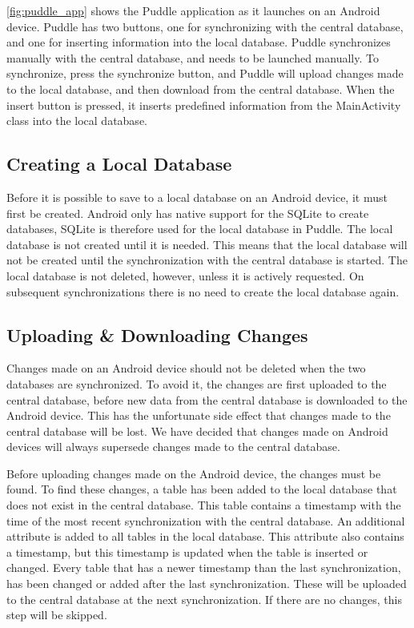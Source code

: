 \autoref{fig:puddle_app} shows the Puddle application as it launches on an Android device. Puddle has two buttons, one for synchronizing with the central database, and one for inserting information into the local database. Puddle synchronizes manually with the central database, and needs to be launched manually. To synchronize, press the synchronize button, and Puddle will upload changes made to the local database, and then download from the central database. When the insert button is pressed, it inserts predefined information from the MainActivity class into the local database.

\subsection{Creating a Local Database}
Before it is possible to save to a local database on an Android device, it must first be created. Android only has native support for the SQLite to create databases, SQLite is therefore used for the local database in Puddle. %
The local database is not created until it is needed. This means that the local database will not be created until the synchronization with the central database is started. The local database is not deleted, however, unless it is actively requested. On subsequent synchronizations there is no need to create the local database again.

\subsection{Uploading \& Downloading Changes}
Changes made on an Android device should not be deleted when the two databases are synchronized. To avoid it, the changes are first uploaded to the central database, before new data from the central database is downloaded to the Android device. This has the unfortunate side effect that changes made to the central database will be lost. We have decided that changes made on Android devices will always supersede changes made to the central database.

Before uploading changes made on the Android device, the changes must be found. To find these changes, a table has been added to the local database that does not exist in the central database. This table contains a timestamp with the time of the most recent synchronization with the central database. An additional attribute is added to all tables in the local database. This attribute also contains a timestamp, but this timestamp is updated when the table is inserted or changed. Every table that has a newer timestamp than the last synchronization, has been changed or added after the last synchronization. These will be uploaded to the central database at the next synchronization. If there are no changes, this step will be skipped.

